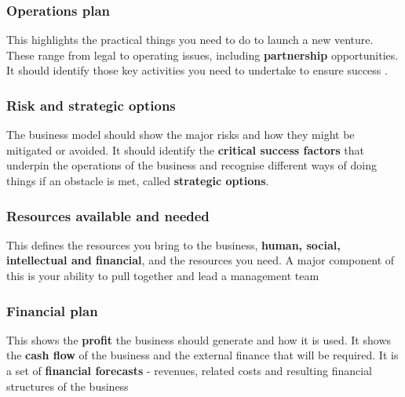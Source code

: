 \documentclass{article}[18pt]
\begin{document}
\subsubsection{Operations plan}
This highlights the practical things you need to do to launch a new venture. These range from legal to operating issues, including \textbf{partnership} opportunities. It should identify those key activities you need to undertake to ensure success .
\subsubsection{Risk and strategic options}
The business model should show the major risks and how they might be mitigated or avoided. It should identify the \textbf{critical success factors} that underpin the operations of the business and recognise different ways of doing things if an obstacle is met, called \textbf{strategic options}.
\subsubsection{Resources available and needed}
This defines the resources you bring to the business, \textbf{human, social, intellectual and financial}, and the resources you need. A major component of this is your ability to pull together and lead a management team
\subsubsection{Financial plan}
This shows the \textbf{profit} the business should generate and how it is used. It shows the \textbf{cash flow} of the business and the external finance that will be required. It is a set of \textbf{financial forecasts} - revenues, related costs and resulting financial structures of the business
\end{document}
